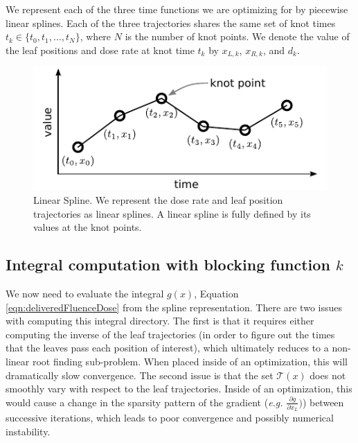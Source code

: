 \documentclass[12pt]{article}
\begin{document}
We represent each of the three time functions we are optimizing for
by piecewise linear splines. Each of the three trajectories shares the same set of knot times $t_k \in \{t_0, t_1, \dots, t_N\}$, where $N$ is the number of knot points. We denote the value of the leaf positions and dose rate at knot time $t_k$ by $x_{L,k}$, $x_{R,k}$, and $d_k$.

\begin{figure}
  \centering
  \includegraphics{fig/linearSpline.pdf}
  \caption{Linear Spline. We represent the dose rate and leaf position trajectories as linear splines. A linear spline is fully defined by its values at the knot points. }
  \label{fig:linearSpline}
\end{figure}

\subsection{Integral computation with blocking function $k$}

We now need to evaluate the integral $g(x)$, Equation \ref{eqn:deliveredFluenceDose} from the spline representation.
There are two issues with computing this integral directory.
The first is that it requires either computing the inverse of the leaf trajectories (in order to figure out the times that the leaves pass each position of interest), which
ultimately reduces to a non-linear root finding sub-problem. When placed inside of an optimization, this will dramatically slow convergence.
The second issue is that the set $\mathcal{T}(x)$ does not smoothly vary with respect to the leaf trajectories.
Inside of an optimization, this would cause a change in the sparsity pattern of the gradient
(\textit{e.g.} $\tfrac{\partial g}{\partial x_L})$)
between successive iterations,
which leads to poor convergence and possibly numerical instability.
\end{document}
